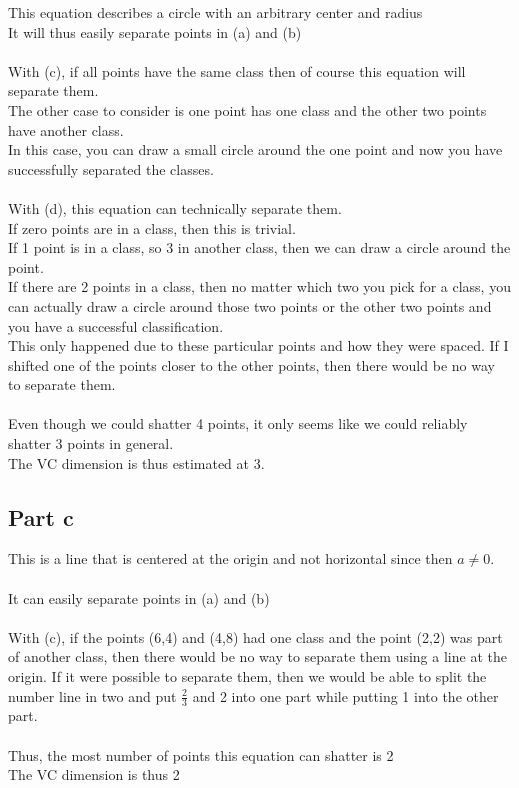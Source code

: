 \documentclass[twoside,11pt]{article}
\theoremstyle{definition}
\begin{document}
This equation describes a circle with an arbitrary center and radius\\
It will thus easily separate points in (a) and (b)\\
\\
With (c), if all points have the same class then of course this equation will separate them. \\
The other case to consider is one point has one class and the other two points have another class. \\
In this case, you can draw a small circle around the one point and now you have successfully separated the classes.\\
\\
With (d), this equation can technically separate them.\\
If zero points are in a class, then this is trivial. \\
If 1 point is in a class, so 3 in another class, then we can draw a circle around the point.\\
If there are 2 points in a class, then no matter which two you pick for a class, you can actually draw a circle around those two points or the other two points and you have a successful classification. \\
This only happened due to these particular points and how they were spaced. If I shifted one of the points closer to the other points, then there would be no way to separate them. \\
\\
Even though we could shatter 4 points, it only seems like we could reliably shatter 3 points in general.\\
The VC dimension is thus estimated at 3.

\subsection*{Part c}

This is a line that is centered at the origin and not horizontal since then $a \neq 0$. \\
\\
It can easily separate points in (a) and (b)\\
\\
With (c), if the points (6,4) and (4,8) had one class and the point (2,2) was part of another class, then there would be no way to separate them using a line at the origin. If it were possible to separate them, then we would be able to split the number line in two and put $\frac{2}{3}$ and 2 into one part while putting 1 into the other part.\\
\\
Thus, the most number of points this equation can shatter is 2\\
The VC dimension is thus 2
\end{document}
